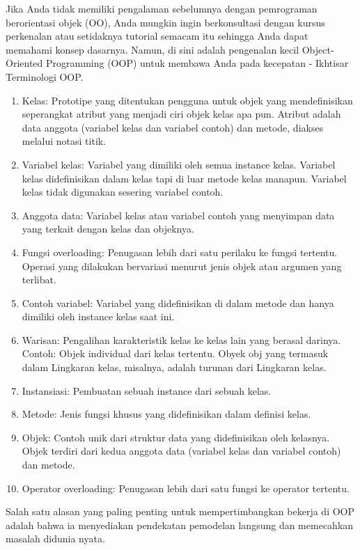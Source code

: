 Jika Anda tidak memiliki pengalaman sebelumnya dengan pemrograman berorientasi objek (OO), Anda mungkin  ingin berkonsultasi dengan kursus perkenalan atau setidaknya tutorial semacam itu sehingga Anda dapat memahami konsep dasarnya. Namun, di sini adalah pengenalan kecil Object-Oriented Programming (OOP) untuk membawa Anda pada kecepatan - Ikhtisar Terminologi OOP.

\begin {enumerate}
\item Kelas: Prototipe yang ditentukan pengguna untuk objek yang mendefinisikan seperangkat atribut yang menjadi ciri objek kelas apa pun. Atribut adalah data anggota (variabel kelas dan variabel contoh) dan metode, diakses melalui notasi titik.
\item Variabel kelas: Variabel yang dimiliki oleh semua instance kelas. Variabel kelas didefinisikan dalam kelas tapi di luar metode kelas manapun. Variabel kelas tidak digunakan sesering variabel contoh.
\item Anggota data: Variabel kelas atau variabel contoh yang menyimpan data yang terkait dengan kelas dan objeknya.
\item Fungsi overloading: Penugasan lebih dari satu perilaku ke fungsi tertentu. Operasi yang dilakukan bervariasi menurut jenis objek atau argumen yang terlibat.
\item Contoh variabel: Variabel yang didefinisikan di dalam metode dan hanya dimiliki oleh instance kelas saat ini.
\item Warisan: Pengalihan karakteristik kelas ke kelas lain yang berasal darinya. Contoh: Objek individual dari kelas tertentu. Obyek obj yang termasuk dalam Lingkaran kelas, misalnya, adalah turunan dari Lingkaran kelas.
\item Instansiasi: Pembuatan sebuah instance dari sebuah kelas.
\item Metode: Jenis fungsi khusus yang didefinisikan dalam definisi kelas.  
\item Objek: Contoh unik dari struktur data yang didefinisikan oleh kelasnya. Objek terdiri dari kedua anggota data (variabel kelas dan variabel contoh) dan metode.
\item Operator overloading: Penugasan lebih dari satu fungsi ke operator tertentu.
\end{enumerate}

Salah satu alasan yang paling penting untuk mempertimbangkan bekerja di OOP adalah bahwa ia menyediakan pendekatan pemodelan langsung dan memecahkan masalah didunia nyata.


